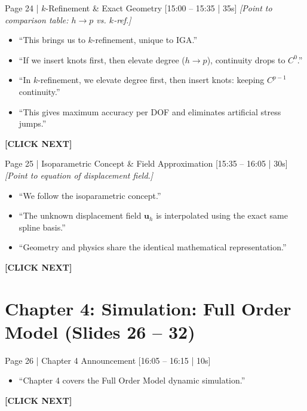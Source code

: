 \documentclass[9pt,a4paper]{article}
\begin{document}
\begin{slidebox}{Page 24 | $k$-Refinement \& Exact Geometry \hfill [15:00 -- 15:35 | 35s]}
\textit{[Point to comparison table: $h \to p$ vs. $k$-ref.]}
\begin{itemize}
  \item ``This brings us to $k$-refinement, unique to IGA.''
  \item ``If we insert knots first, then elevate degree ($h \to p$), continuity drops to $C^0$.''
  \item ``In $k$-refinement, we elevate degree first, then insert knots: keeping $C^{p-1}$ continuity.''
  \item ``This gives maximum accuracy per DOF and eliminates artificial stress jumps.''
\end{itemize}
\textbf{\color{cnamred}[CLICK NEXT]}
\end{slidebox}

\begin{slidebox}{Page 25 | Isoparametric Concept \& Field Approximation \hfill [15:35 -- 16:05 | 30s]}
\textit{[Point to equation of displacement field.]}
\begin{itemize}
  \item ``We follow the isoparametric concept.''
  \item ``The unknown displacement field $\mathbf{u}_h$ is interpolated using the exact same spline basis.''
  \item ``Geometry and physics share the identical mathematical representation.''
\end{itemize}
\textbf{\color{cnamred}[CLICK NEXT]}
\end{slidebox}

\section*{Chapter 4: Simulation: Full Order Model (Slides 26 -- 32)}

\begin{slidebox}{Page 26 | Chapter 4 Announcement \hfill [16:05 -- 16:15 | 10s]}
\begin{itemize}
  \item ``Chapter 4 covers the Full Order Model dynamic simulation.''
\end{itemize}
\textbf{\color{cnamred}[CLICK NEXT]}
\end{slidebox}
\end{document}
